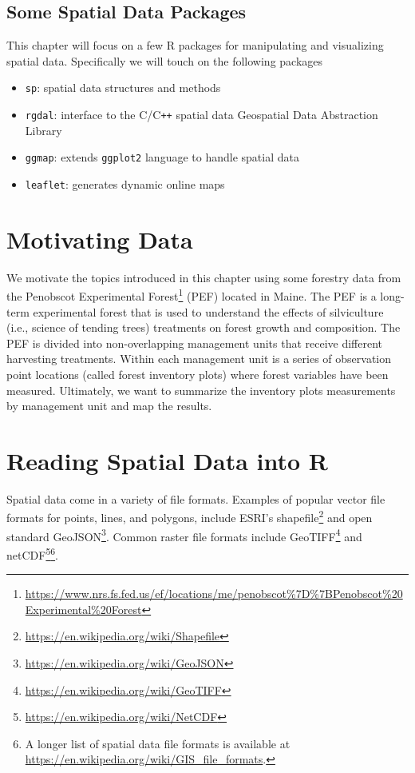 \documentclass[
]{krantz}
\providecommand{\tightlist}{%
  \setlength{\itemsep}{0pt}\setlength{\parskip}{0pt}}
\renewcommand{\href}[2]{#2\footnote{\url{#1}}}
\begin{document}
\hypertarget{some-spatial-data-packages}{%
\subsection{Some Spatial Data Packages}\label{some-spatial-data-packages}}

This chapter will focus on a few R packages for manipulating and visualizing spatial data. Specifically we will touch on the following packages

\begin{itemize}
\tightlist
\item
  \texttt{sp}: spatial data structures and methods
\item
  \texttt{rgdal}: interface to the C/C\texttt{++} spatial data Geospatial Data Abstraction Library
\item
  \texttt{ggmap}: extends \texttt{ggplot2} language to handle spatial data
\item
  \texttt{leaflet}: generates dynamic online maps
\end{itemize}

\hypertarget{motivating-data}{%
\section{Motivating Data}\label{motivating-data}}

We motivate the topics introduced in this chapter using some forestry data from the \href{https://www.nrs.fs.fed.us/ef/locations/me/penobscot\%7D\%7BPenobscot\%20Experimental\%20Forest}{Penobscot Experimental Forest} (PEF) located in Maine. The PEF is a long-term experimental forest that is used to understand the effects of silviculture (i.e., science of tending trees) treatments on forest growth and composition. The PEF is divided into non-overlapping management units that receive different harvesting treatments. Within each management unit is a series of observation point locations (called forest inventory plots) where forest variables have been measured. Ultimately, we want to summarize the inventory plots measurements by management unit and map the results.

\hypertarget{reading-spatial-data-into-r}{%
\section{Reading Spatial Data into R}\label{reading-spatial-data-into-r}}

Spatial data come in a variety of file formats. Examples of popular vector file formats for points, lines, and polygons, include ESRI's \href{https://en.wikipedia.org/wiki/Shapefile}{shapefile} and open standard \href{https://en.wikipedia.org/wiki/GeoJSON}{GeoJSON}. Common raster file formats include \href{https://en.wikipedia.org/wiki/GeoTIFF}{GeoTIFF} and \href{https://en.wikipedia.org/wiki/NetCDF}{netCDF}\footnote{A longer list of spatial data file formats is available at \url{https://en.wikipedia.org/wiki/GIS_file_formats}.}.
\end{document}

